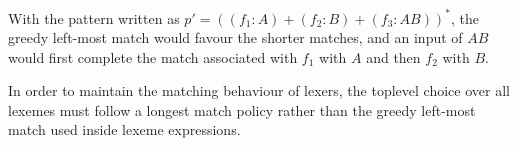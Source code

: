 With the pattern written as $p' = ((f_1:A) + (f_2:B) + (f_3:AB))^*$, the greedy
left-most match would favour the shorter matches, and an input of $AB$ would
first complete the match associated with $f_1$ with $A$ and then $f_2$ with $B$.

In order to maintain the matching behaviour of lexers, the toplevel choice over
all lexemes must follow a longest match policy rather than the greedy left-most
match used inside lexeme expressions.


